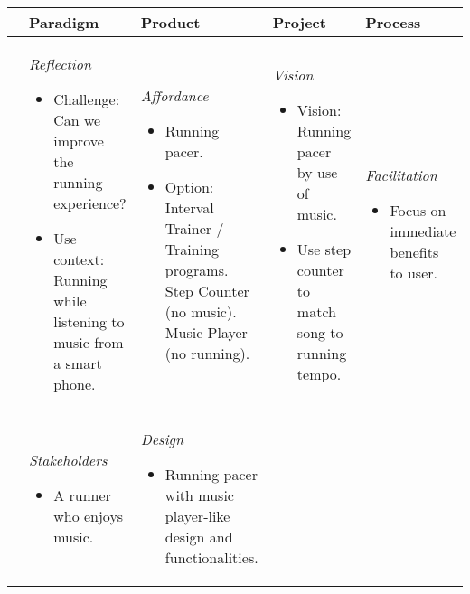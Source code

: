 \begin{table}
\footnotesize
\begin{tabular}{|l|l|l|l|l|} \hline
         & \textbf{Paradigm} & \textbf{Product} & \textbf{Project} & \textbf{Process} \\ \hline
\parbox[t][4cm][c]{0.02\textwidth}{} %
	& \parbox[t][][c]{0.20\textwidth}{ 
		\textit{Reflection}
		\begin{itemize}[leftmargin=*]
		\item Challenge: Can we improve the running experience?
		\item Use context: Running while listening to music from a smart phone.
		\end{itemize}
	}
	& \parbox[t][][c]{0.20\textwidth}{ 
		\textit{Affordance} 
		\begin{itemize}[leftmargin=*]
		\item Running pacer. 
		\item Option: 
			Interval Trainer / Training programs. \newline
			Step Counter (no music). \newline
			Music Player (no running). 
		\end{itemize}	 
	}
	& \parbox[t][][c]{0.20\textwidth}{  
		\textit{Vision} 
		\begin{itemize}[leftmargin=*]
		\item Vision: Running pacer by use of music. 
		\item Use step counter to match song to running tempo.
		\end{itemize}
	}
    & \parbox[t][][c]{0.20\textwidth}{ 
	    \textit{Facilitation}
   		\begin{itemize}[leftmargin=*]
		\item Focus on immediate benefits to user.
		\end{itemize}
   } \\ \hline
\parbox[t][5cm][c]{0.02\textwidth}{}
	& \parbox[t][][c]{0.20\textwidth}{ 
	    \textit{Stakeholders} 
		\begin{itemize}[leftmargin=*]
		\item A runner who enjoys music.
		\end{itemize}
	}
	& \parbox[t][][c]{0.20\textwidth}{ 
		\textit{Design} 
		\begin{itemize}[leftmargin=*]
		\item Running pacer with music player-like design and functionalities.  

\end{itemize}}
\end{tabular}
\end{table}

